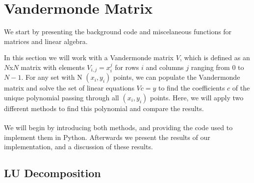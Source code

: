 \section{Vandermonde Matrix}

We start by presenting the background code and miscelaneous functions for matrices and linear algebra.





In this section we will work with a Vandermonde matrix $V$, which is defined as an $N$x$N$ matrix with elements $V_{i,j} = x_i^j$ for rows $i$ and columns $j$ ranging from $0$ to $N-1$. For any set with N $(x_i, y_i)$ points, we can populate the Vandermonde matrix and solve the set of linear equations $Vc = y$ to find the coefficients $c$ of the unique polynomial passing through all $(x_i, y_i)$ points. Here, we will apply two different methods to find this polynomial and compare the results. 
\\ \\
We will begin by introducing both methods, and providing the code used to implement them in Python. Afterwards we present the results of our implementation, and a discussion of these results.

\subsection{LU Decomposition}

